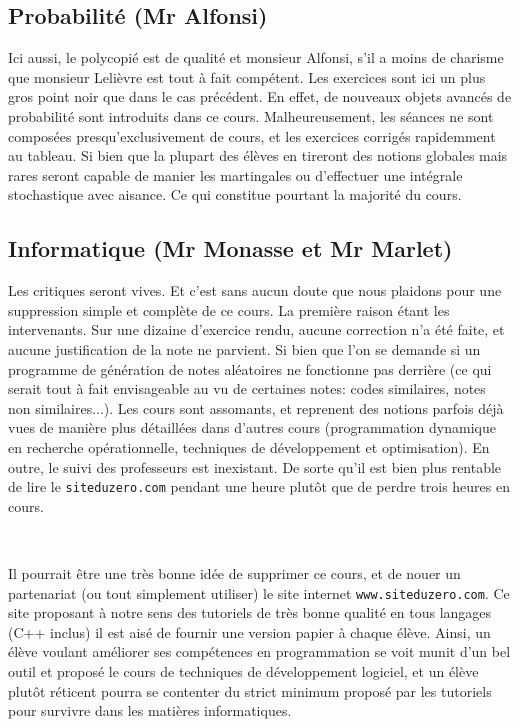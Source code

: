 \documentclass{report}
\begin{document}
\subsection{Probabilité (Mr Alfonsi)}
Ici aussi, le polycopié est de qualité et monsieur Alfonsi, s'il a moins de charisme que monsieur Lelièvre est tout à fait compétent. Les exercices sont ici un plus gros point noir que dans le cas précédent. En effet, de nouveaux objets avancés de probabilité sont introduits dans ce cours. Malheureusement, les séances ne sont composées presqu'exclusivement de cours, et les exercices corrigés rapidemment au tableau. Si bien que la plupart des élèves en tireront des notions globales mais rares seront capable de manier les martingales ou d'effectuer une intégrale stochastique avec aisance. Ce qui constitue pourtant la majorité du cours.

\subsection{Informatique (Mr Monasse et Mr Marlet)}

Les critiques seront vives. Et c'est sans aucun doute que nous plaidons pour une suppression simple et complète de ce cours. La première raison étant les intervenants. Sur une dizaine d'exercice rendu, aucune correction n'a été faite, et aucune justification de la note ne parvient. Si bien que l'on se demande si un programme de génération de notes aléatoires ne fonctionne pas derrière (ce qui serait tout à fait envisageable au vu de certaines notes: codes similaires, notes non similaires...). Les cours sont assomants, et reprenent des notions parfois déjà vues de manière plus détaillées dans d'autres cours (programmation dynamique en recherche opérationnelle, techniques de développement et optimisation). En outre, le suivi des professeurs est inexistant. De sorte qu'il est bien plus rentable de lire le \verb|siteduzero.com| pendant une heure plutôt que de perdre trois heures en cours.

~

Il pourrait être une très bonne idée de supprimer ce cours, et de nouer un partenariat (ou tout simplement utiliser) le site internet \verb|www.siteduzero.com|. Ce site proposant à notre sens des tutoriels de très bonne qualité en tous langages (C++ inclus) il est aisé de fournir une version papier à chaque élève. Ainsi, un élève voulant améliorer ses compétences en programmation se voit munit d'un bel outil et proposé le cours de techniques de développement logiciel, et un élève plutôt réticent pourra se contenter du strict minimum proposé par les tutoriels pour survivre dans les matières informatiques.
\end{document}
